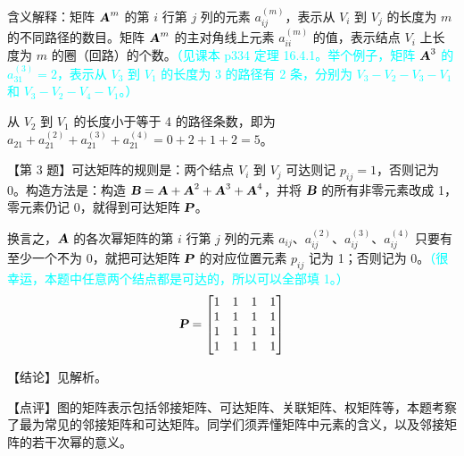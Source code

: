 \documentclass[UTF8]{ctexart}
\newcommand\A{\text{\slshape\bfseries A}}
\newcommand\B{\text{\slshape\bfseries B}}
\renewcommand\P{\text{\slshape\bfseries P}}
\begin{document}
含义解释：矩阵 $\A^m$ 的第 $i$ 行第 $j$ 列的元素 $a_{ij}^{(m)}$，表示从 $V_i$ 到 $V_j$ 的长度为 $m$ 的不同路径的数目。矩阵 $\A^m$ 的主对角线上元素 $a_{ii}^{(m)}$ 的值，表示结点 $V_i$ 上长度为 $m$ 的圈（回路）的个数。\textcolor{cyan}{（见课本 p334 定理 16.4.1。举个例子，矩阵 $\A^3$ 的 $a_{31}^{(3)}=2$，表示从 $V_3$ 到 $V_1$ 的长度为 3 的路径有 2 条，分别为 $V_3-V_2-V_3-V_1$ 和 $V_3-V_2-V_4-V_1$。）}

从 $V_2$ 到 $V_1$ 的长度小于等于 4 的路径条数，即为 $a_{21} + a_{21}^{(2)} + a_{21}^{(3)} + a_{21}^{(4)} = 0+2+1+2 = 5$。

【第 3 题】可达矩阵的规则是：两个结点 $V_i$ 到 $V_j$ 可达则记 $p_{ij}=1$，否则记为 0。构造方法是：构造 $\B = \A + \A^2 + \A^3 + \A^4$，并将 $\B$ 的所有非零元素改成 1，零元素仍记 0，就得到可达矩阵 $\P$。

换言之，$\A$ 的各次幂矩阵的第 $i$ 行第 $j$ 列的元素 $a_{ij}$、$a_{ij}^{(2)}$、$a_{ij}^{(3)}$、$a_{ij}^{(4)}$ 只要有至少一个不为 0，就把可达矩阵 $\P$ 的对应位置元素 $p_{ij}$ 记为 1；否则记为 0。\textcolor{cyan}{（很幸运，本题中任意两个结点都是可达的，所以可以全部填 1。）}
\begin{equation}
    \P = \begin{bmatrix} 1&1&1&1 \\ 1&1&1&1 \\ 1&1&1&1 \\ 1&1&1&1 \end{bmatrix}
\end{equation}

\textcolor{cyan!80!black}{【结论】见解析。}

\textcolor{cyan!80!black}{【点评】图的矩阵表示包括邻接矩阵、可达矩阵、关联矩阵、权矩阵等，本题考察了最为常见的邻接矩阵和可达矩阵。同学们须弄懂矩阵中元素的含义，以及邻接矩阵的若干次幂的意义。}
\end{document}
